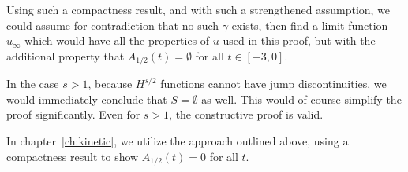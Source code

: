 Using such a compactness result, and with such a strengthened assumption, we could assume for contradiction that no such $\gamma$ exists, then find a limit function $u_\infty$ which would have all the properties of $u$ used in this proof, but with the additional property that $A_{1/2}(t) = \emptyset$ for all $t \in [-3,0]$.  

In the case $s > 1$, because $H^{s/2}$ functions cannot have jump discontinuities, we would immediately conclude that $S = \emptyset$ as well.  This would of course simplify the proof significantly.  Even for $s > 1$, the constructive proof is valid.  

In chapter~\ref{ch:kinetic}, we utilize the approach outlined above, using a compactness result to show $A_{1/2}(t) = 0$ for all $t$.  